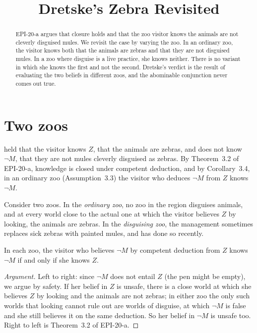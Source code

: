 \documentclass{situationist-preprint}
\title{Dretske's Zebra Revisited}
\begin{document}
\maketitle

\begin{abstract}
EPI-20-a argues that closure holds and that the zoo visitor knows the animals are not cleverly disguised mules. We revisit the case by varying the zoo. In an ordinary zoo, the visitor knows both that the animals are zebras and that they are not disguised mules. In a zoo where disguise is a live practice, she knows neither. There is no variant in which she knows the first and not the second. Dretske's verdict is the result of evaluating the two beliefs in different zoos, and the abominable conjunction never comes out true.
\end{abstract}

\section{Two zoos}

\citet{Dretske1970} held that the visitor knows $Z$, that the animals are zebras, and does not know $\neg M$, that they are not mules cleverly disguised as zebras. By Theorem~3.2 of EPI-20-a, knowledge is closed under competent deduction, and by Corollary~3.4, in an ordinary zoo (Assumption~3.3) the visitor who deduces $\neg M$ from $Z$ knows $\neg M$.

Consider two zoos. In the \emph{ordinary zoo}, no zoo in the region disguises animals, and at every world close to the actual one at which the visitor believes $Z$ by looking, the animals are zebras. In the \emph{disguising zoo}, the management sometimes replaces sick zebras with painted mules, and has done so recently.

\begin{proposition}\label{p:nosplit}
In each zoo, the visitor who believes $\neg M$ by competent deduction from $Z$ knows $\neg M$ if and only if she knows $Z$.
\end{proposition}

\begin{proof}[Argument]
Left to right: since $\neg M$ does not entail $Z$ (the pen might be empty), we argue by safety. If her belief in $Z$ is unsafe, there is a close world at which she believes $Z$ by looking and the animals are not zebras; in either zoo the only such worlds that looking cannot rule out are worlds of disguise, at which $\neg M$ is false and she still believes it on the same deduction. So her belief in $\neg M$ is unsafe too. Right to left is Theorem~3.2 of EPI-20-a.
\end{proof}
\end{document}
